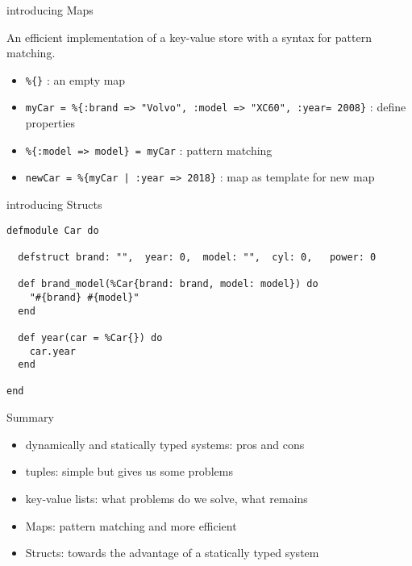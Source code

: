 \begin{frame}{introducing Maps}

  An efficient implementation of a key-value store with a syntax for pattern matching. 

  \vspace{10pt}\pause

  \begin{itemize}
  \item {\tt \%\{\}} : an empty map \pause
  \item {\tt myCar = \%\{:brand => "Volvo", :model => "XC60", :year= 2008\}} : define properties \pause
  \item {\tt \%\{:model => model\} = myCar} : pattern matching \pause
  \item {\tt newCar = \%\{myCar | :year => 2018\}} : map as template for new map
  \end{itemize}
  

  \vspace{20pt}
\end{frame}

\begin{frame}[fragile]{introducing Structs}

\begin{verbatim}
defmodule Car do

  defstruct brand: "",  year: 0,  model: "",  cyl: 0,   power: 0 

  def brand_model(%Car{brand: brand, model: model}) do
    "#{brand} #{model}"
  end

  def year(car = %Car{}) do
    car.year
  end

end
\end{verbatim}

  \vspace{20pt}
  
\end{frame}

\begin{frame}{Summary}

  \begin{itemize}
  \item dynamically and statically typed systems: pros and cons
  \item tuples: simple but gives us some problems
  \item key-value lists: what problems do we solve, what remains
  \item Maps: pattern matching and more efficient
  \item Structs: towards the advantage of a statically typed system
  \end{itemize}
  
\end{frame}






